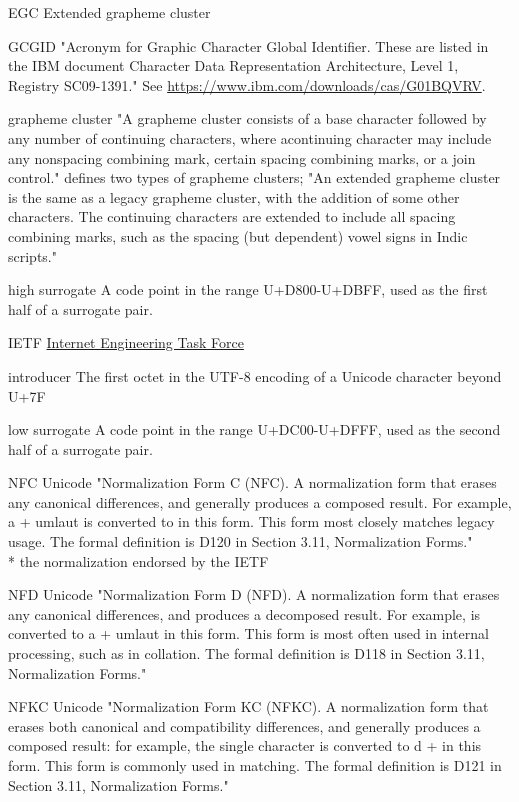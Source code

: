 \documentclass[b4paper]{article}
\begin{document}
\begin{definition}
\item [EGC] Extended grapheme cluster
\item [GCGID] "Acronym for Graphic Character Global Identifier.
These are listed in the IBM document
Character Data Representation Architecture, Level 1, Registry SC09-1391."
See \url{https://www.ibm.com/downloads/cas/G01BQVRV}.
\item [grapheme cluster]
"A grapheme cluster consists of a base character followed by any
number of continuing characters, where acontinuing character may
include any nonspacing combining mark, certain spacing combining
marks, or a join control."
{\cite{Annex29}} defines two types of grapheme clusters;
"An extended grapheme cluster is the same as a legacy grapheme cluster,
with the addition of some other characters.
The continuing characters are extended to include all spacing combining marks,
such as the spacing (but dependent) vowel signs in Indic scripts."
\item [high surrogate] A code point in the range U+D800-U+DBFF, used
as the first half of a surrogate pair.
\item [IETF] \href{https://ietf.org}{Internet Engineering Task Force}
\item [introducer] The first octet in the UTF-8 encoding of a Unicode character beyond U+7F
\item [low surrogate] A code point in the range U+DC00-U+DFFF, used
as the second half of a surrogate pair.
\item [NFC]  Unicode
"Normalization Form C (NFC). A normalization form that erases any
canonical differences, and generally produces a composed result. For
example, a + umlaut is converted to  in this form. This form most
closely matches legacy usage. The formal definition is D120 in Section
3.11, Normalization Forms."
\\*
the normalization endorsed by the IETF
\item [NFD] Unicode
"Normalization Form D (NFD). A normalization form that erases any
canonical differences, and produces a decomposed result. For example,
 is converted to a + umlaut in this form. This form is most often
used in internal processing, such as in collation. The formal
definition is D118 in Section 3.11, Normalization Forms."

\item [NFKC] Unicode
"Normalization Form KC (NFKC). A normalization form that erases both
canonical and compatibility differences, and generally produces a
composed result: for example, the single  character is converted to d
+  in this form. This form is commonly used in matching. The formal
definition is D121 in Section 3.11, Normalization Forms."


\end{definition}
\end{document}
